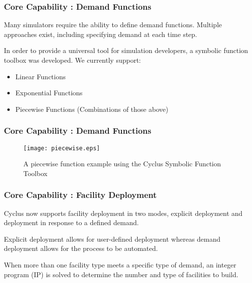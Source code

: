 
\begin{frame}
  \frametitle{Core Capability : Demand Functions}
  Many simulators require the ability to define demand functions. 
  Multiple approaches exist, including specifying demand at each time
  step. 

  \vspace{0.2cm}

  In order to provide a universal tool for simulation developers, a 
  symbolic function toolbox was developed. We currently support:
  \begin{itemize}
    \item Linear Functions
    \item Exponential Functions
    \item Piecewise Functions (Combinations of those above)
  \end{itemize}
\end{frame}

\begin{frame}[ctb!]
  \frametitle{Core Capability : Demand Functions}
  \begin{figure}[htbp!]
    \begin{center}
      \texttt{[image: piecewise.eps]}
    \caption{A piecewise function example using the Cyclus Symbolic 
      Function Toolbox}
    \label{fig:piecewisefunction}
    \end{center}
  \end{figure}
\end{frame}

\begin{frame}
  \frametitle{Core Capability : Facility Deployment}
  Cyclus now supports facility deployment in two modes, explicit 
  deployment and deployment in response to a defined demand.

  \vspace{1cm}

  Explicit deployment allows for user-defined deployment whereas 
  demand deployment allows for the process to be automated.

  \vspace{1cm}

  When more than one facility type meets a specific type of demand,
  an integer program (IP) is solved to determine the number and type of
  facilities to build.
\end{frame}

